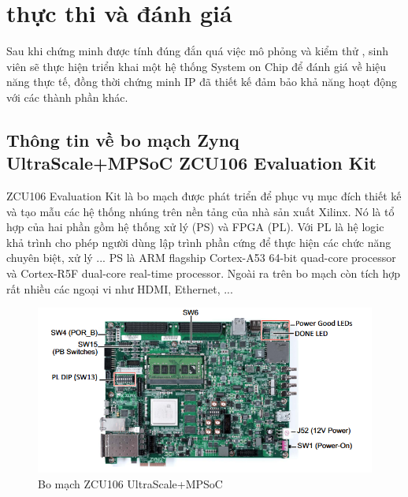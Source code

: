 \clearpage
{}

\setcounter{chapter}{4}

\chapter[{THỰC THI VÀ ĐÁNH GIÁ}]{thực thi và đánh giá}
Sau khi chứng minh được tính đúng đắn quá việc mô phỏng và kiểm thử , sinh viên sẽ thực hiện triển khai một hệ thống System on Chip để đánh giá về hiệu năng thực tế, đồng thời chứng minh IP đã thiết kế đảm bảo khả năng hoạt động với các thành phần khác.
\section{Thông tin về bo mạch Zynq UltraScale+MPSoC ZCU106 Evaluation Kit}
ZCU106 Evaluation Kit là bo mạch được phát triển để phục vụ mục đích thiết kế và tạo mẫu các hệ thống nhúng trên nền tảng của nhà sản xuất Xilinx. Nó là tổ hợp của hai phần gồm hệ thống xử lý (PS) và FPGA (PL). Với PL là hệ logic khả trình cho phép người dùng lập trình phần cứng để thực hiện các chức năng chuyên biệt, xử lý ... PS là ARM flagship Cortex-A53 64-bit quad-core processor và Cortex-R5F dual-core real-time processor. Ngoài ra trên bo mạch còn tích hợp rất nhiều các ngoại vi như HDMI, Ethernet, ...
\begin{figure}[!ht]
	\centering
	\includegraphics[width=1\linewidth]{figures/zcu106.png}
	\caption{Bo mạch ZCU106 UltraScale+MPSoC}
	\label{fig:zcu106}
\end{figure}
